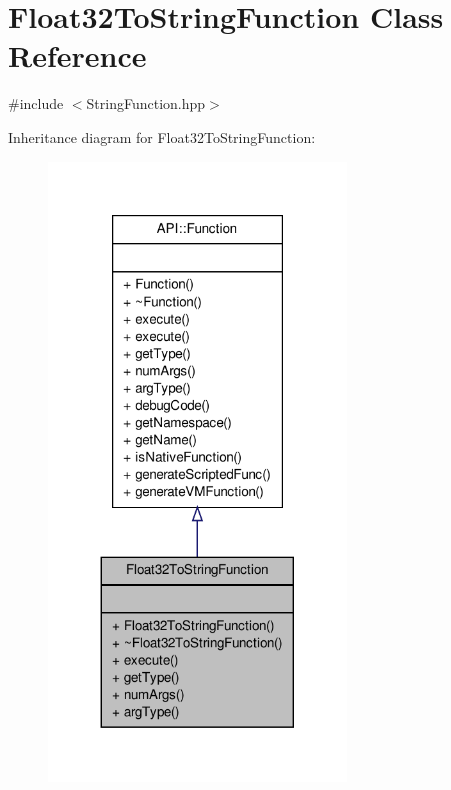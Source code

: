 \hypertarget{class_float32_to_string_function}{\section{Float32\-To\-String\-Function Class Reference}
\label{class_float32_to_string_function}
}


{\ttfamily \#include $<$String\-Function.\-hpp$>$}



Inheritance diagram for Float32\-To\-String\-Function\-:
\nopagebreak
\begin{figure}[H]
\begin{center}
\leavevmode
\includegraphics[width=224pt]{class_float32_to_string_function__inherit__graph}
\end{center}
\end{figure}


